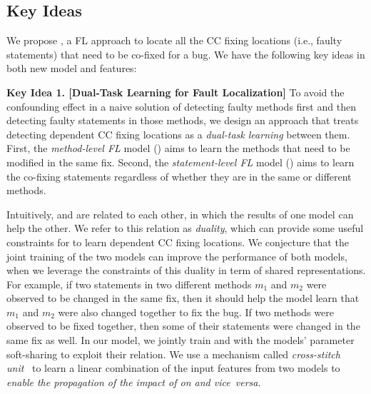 \subsection{Key Ideas}
\label{sec:key-ideas}

We propose {\tool}, a FL approach to locate all the CC fixing
locations (i.e., faulty statements) that need to be co-fixed
for a bug. We have the following key ideas in both new model
and features:

{\bf Key Idea 1. [Dual-Task Learning for Fault Localization]} To avoid the
confounding effect in a naive solution of detecting faulty methods
first and then detecting faulty statements in those methods, we design
an approach that treats detecting dependent CC fixing locations as a
{\em dual-task learning} between them. First, the {\em method-level
  FL} model () aims to learn the methods that need
to be modified in the same fix. Second, the {\em statement-level
  FL} model () aims to learn the co-fixing
statements regardless of whether they are in the same or different
methods.

Intuitively,  and  are related to each
other, in which the results of one model can help the other. We refer
to this relation as {\em duality}, which can provide some useful
constraints for {\tool} to learn dependent CC fixing locations.
%
We conjecture that the joint training of the two models can improve
the performance of both models, when we leverage the constraints of
this duality in term of shared representations. For example, if two
statements in two different methods $m_1$ and $m_2$ were observed to
be changed in the same fix, then it should help the model learn that
$m_1$ and $m_2$ were also changed together to fix the bug.  If two
methods were observed to be fixed together, then some of their
statements were changed in the same fix as well. In our model, we
jointly train  and  with the models'
parameter soft-sharing to exploit their relation. We use a mechanism
called {\em cross-stitch unit}~\cite{misra2016cross} to learn a linear
combination of the input features from two models to {\em enable
  the propagation of the impact of  on  and
  vice~versa}.




